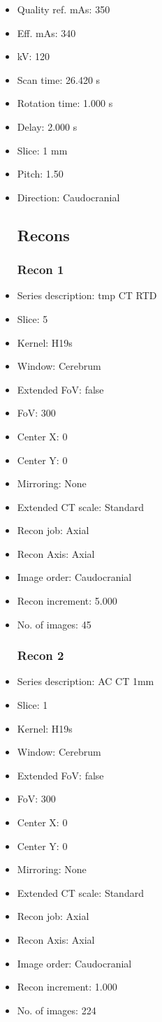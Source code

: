 \documentclass[12pt]{article}
\begin{document}
\begin{itemize}
\subsection{Scan}
\item Quality ref. mAs: 350\item Eff. mAs: 340\item kV: 120\item Scan time: 26.420 s\item Rotation time: 1.000 s\item Delay: 2.000 s\item Slice: 1 mm\item Pitch: 1.50\item Direction: Caudocranial\subsection{Recons}

\subsubsection{Recon 1}
\item Series description: tmp CT RTD
\item Slice: 5
\item Kernel: H19s
\item Window: Cerebrum
\item Extended FoV: false
\item FoV: 300
\item Center X: 0
\item Center Y: 0
\item Mirroring: None
\item Extended CT scale: Standard
\item Recon job: Axial
\item Recon Axis: Axial
\item Image order: Caudocranial
\item Recon increment: 5.000
\item No. of images: 45
\subsubsection{Recon 2}
\item Series description: AC CT 1mm
\item Slice: 1
\item Kernel: H19s
\item Window: Cerebrum
\item Extended FoV: false
\item FoV: 300
\item Center X: 0
\item Center Y: 0
\item Mirroring: None
\item Extended CT scale: Standard
\item Recon job: Axial
\item Recon Axis: Axial
\item Image order: Caudocranial
\item Recon increment: 1.000
\item No. of images: 224

\end{itemize}
\end{document}
